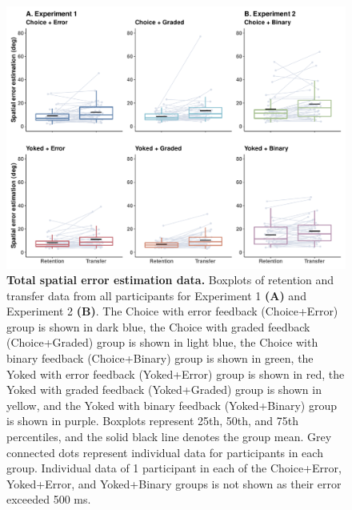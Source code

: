 \documentclass[
  doc, donotrepeattitle,floatsintext]{apa7}
\begin{document}
\begin{figure}

{\centering \includegraphics{../../figs/figS1} 

}

\caption{\small \onehalfspacing \textbf{Total spatial error estimation data.} Boxplots of retention and transfer data from all participants for Experiment 1 \textbf{(A)} and Experiment 2 \textbf{(B)}. The Choice with error feedback (Choice+Error) group is shown in dark blue, the Choice with graded feedback (Choice+Graded) group is shown in light blue, the Choice with binary feedback (Choice+Binary) group is shown in green, the Yoked with error feedback (Yoked+Error) group is shown in red, the Yoked with graded feedback (Yoked+Graded) group is shown in yellow, and the Yoked with binary feedback (Yoked+Binary) group is shown in purple. Boxplots represent 25th, 50th, and 75th percentiles, and the solid black line denotes the group mean. Grey connected dots represent individual data for participants in each group. Individual data of 1 participant in each of the Choice+Error, Yoked+Error, and Yoked+Binary groups is not shown as their error exceeded 500 ms.}\label{fig:figS1}
\end{figure}
\end{document}
